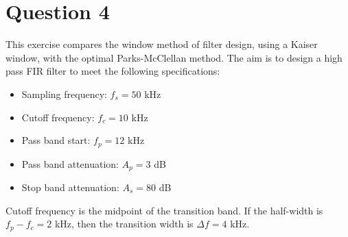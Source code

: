 \section*{Question 4}

This exercise compares the window method of filter design, using a Kaiser window, with the optimal Parks-McClellan method. The aim is to design a high pass FIR filter to meet the following specifications:
\begin{multicols}{2}
    \begin{itemize}
        \item Sampling frequency: $f_s=50$ kHz
        \item Cutoff frequency: $f_c=10$ kHz
        \item Pass band start: $f_p=12$ kHz
        \item Pass band attenuation: $A_p=3$ dB
        \item Stop band attenuation: $A_s=80$ dB
    \end{itemize}
\end{multicols}
Cutoff frequency is the midpoint of the transition band. If the half-width is $f_p-f_c=2$ kHz, then the transition width is $\Delta f=4$ kHz.


